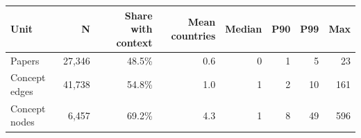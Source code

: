 \begin{tabular}{lrrrrrrr}
\toprule
Unit & N & Share with context & Mean countries & Median & P90 & P99 & Max \\
\midrule
Papers & 27,346 & 48.5\% & 0.6 & 0 & 1 & 5 & 23 \\
Concept edges & 41,738 & 54.8\% & 1.0 & 1 & 2 & 10 & 161 \\
Concept nodes & 6,457 & 69.2\% & 4.3 & 1 & 8 & 49 & 596 \\
\bottomrule
\end{tabular}
